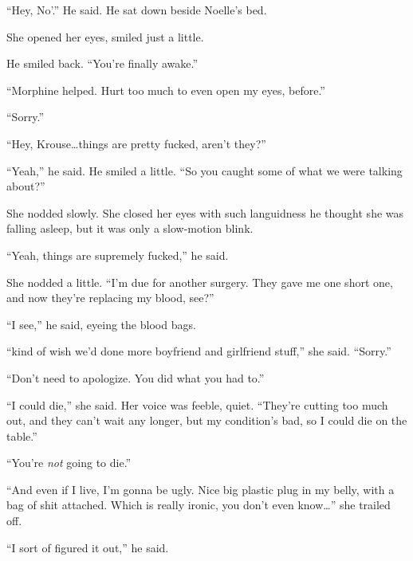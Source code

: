 ``Hey, No'.'' He said.  He sat down beside Noelle's bed.



She opened her eyes, smiled just a little.



He smiled back.  ``You're finally awake.''



``Morphine helped.  Hurt too much to even open my eyes, before.''



``Sorry.''



``Hey, Krouse\ldots things are pretty fucked, aren't they?''



``Yeah,'' he said.  He smiled a little.  ``So you caught some of what we were talking about?''



She nodded slowly.  She closed her eyes with such languidness he thought she was falling asleep, but it was only a slow-motion blink.



``Yeah, things are supremely fucked,'' he said.



She nodded a little.  ``I'm due for another surgery.  They gave me one short one, and now they're replacing my blood, see?''



``I see,'' he said, eyeing the blood bags.



``\ldotsI kind of wish we'd done more boyfriend and girlfriend stuff,'' she said.  ``Sorry.''



``Don't need to apologize.  You did what you had to.''



``I could die,'' she said.  Her voice was feeble, quiet.  ``They're cutting too much out, and they can't wait any longer, but my condition's bad, so I could die on the table.''



``You're \emph{not} going to die.''



``And even if I live, I'm gonna be ugly.  Nice big plastic plug in my belly, with a bag of shit attached.  Which is really ironic, you don't even know\ldots'' she trailed off.



``I sort of figured it out,'' he said.



